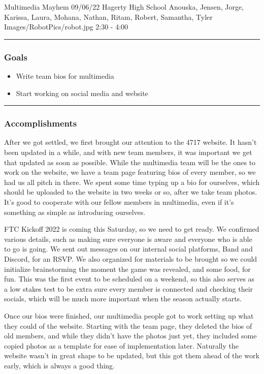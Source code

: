 \insertmeeting 
	{Multimedia Mayhem} 
	{09/06/22}
	{Hagerty High School}
	{Anouska, Jensen, Jorge, Karissa, Laura, Mohana, Nathan, Ritam, Robert, Samantha, Tyler}
	{Images/RobotPics/robot.jpg}
	{2:30 - 4:00}
	
\noindent\hfil\rule{\textwidth}{.4pt}\hfil
\subsubsection*{Goals}
\begin{itemize}
    \item Write team bios for multimedia
    \item Start working on social media and website

\end{itemize} 

\noindent\hfil\rule{\textwidth}{.4pt}\hfil

\subsubsection*{Accomplishments}
After we got settled, we first brought our attention to the 4717 website. It hasn't been updated in a while, and with new team members, it was important we get that updated as soon as possible. While the multimedia team will be the ones to work on the website, we have a team page featuring bios of every member, so we had us all pitch in there. We spent some time typing up a bio for ourselves, which should be uploaded to the website in two weeks or so, after we take team photos. It's good to cooperate with our fellow members in multimedia, even if it's something as simple as introducing ourselves.

FTC Kickoff 2022 is coming this Saturday, so we need to get ready. We confirmed various details, such as making sure everyone is aware and everyone who is able to go is going. We sent out messages on our internal social platforms, Band and Discord, for an RSVP. We also organized for materials to be brought so we could initialize brainstorming the moment the game was revealed, and some food, for fun. This was the first event to be scheduled on a weekend, so this also serves as a low stakes test to be extra sure every member is connected and checking their socials, which will be much more important when the season actually starts.

Once our bios were finished, our multimedia people got to work setting up what they could of the website. Starting with the team page, they deleted the bios of old members, and while they didn't have the photos just yet, they included some copied photos as a template for ease of implementation later. Naturally the website wasn't in great shape to be updated, but this got them ahead of the work early, which is always a good thing.

